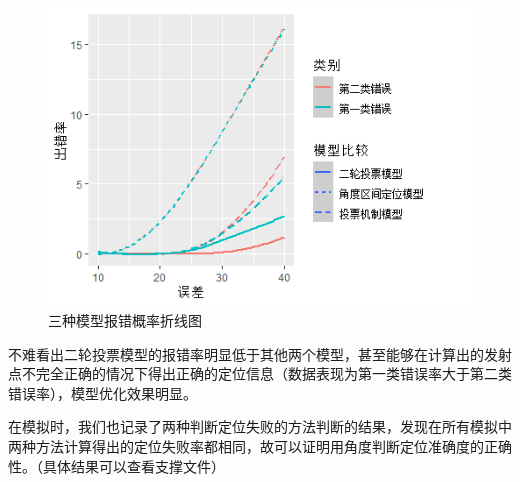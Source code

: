 \documentclass{ctexart}
\begin{document}
\begin{figure}[htbp]
    \centering
    \includegraphics[width=0.60\linewidth]{pic/三类比较.png}
    \caption{三种模型报错概率折线图}
    \label{三种模型报错概率折线图}
\end{figure}

不难看出二轮投票模型的报错率明显低于其他两个模型，甚至能够在计算出的发射点不完全正确的情况下得出正确的定位信息（数据表现为第一类错误率大于第二类错误率），模型优化效果明显。

在模拟时，我们也记录了两种判断定位失败的方法判断的结果，发现在所有模拟中两种方法计算得出的定位失败率都相同，故可以证明用角度判断定位准确度的正确性。（具体结果可以查看支撑文件）
\end{document}
